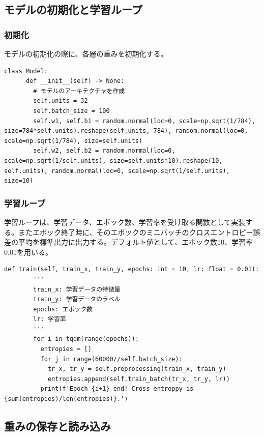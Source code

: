 \documentclass[platex,dvipdfmx]{jsarticle}
\begin{document}
  \newpage

  \subsection{モデルの初期化と学習ループ}

  \subsubsection{初期化}
  モデルの初期化の際に、各層の重みを初期化する。

  \begin{lstlisting}[caption=ex3.py, label=init]
    class Model:
      def __init__(self) -> None:
        # モデルのアーキテクチャを作成
        self.units = 32
        self.batch_size = 100
        self.w1, self.b1 = random.normal(loc=0, scale=np.sqrt(1/784), size=784*self.units).reshape(self.units, 784), random.normal(loc=0, scale=np.sqrt(1/784), size=self.units)
        self.w2, self.b2 = random.normal(loc=0, scale=np.sqrt(1/self.units), size=self.units*10).reshape(10, self.units), random.normal(loc=0, scale=np.sqrt(1/self.units), size=10)
  \end{lstlisting}
  
  \subsubsection{学習ループ}

  学習ループは、学習データ、エポック数、学習率を受け取る関数として実装する。またエポック終了時に、そのエポックのミニバッチのクロスエントロピー誤差の平均を標準出力に出力する。デフォルト値として、エポック数10、学習率0.01を用いる。
  
  \begin{lstlisting}[caption=ex3.py, label=train]
      def train(self, train_x, train_y, epochs: int = 10, lr: float = 0.01):
        '''
        train_x: 学習データの特徴量
        train_y: 学習データのラベル
        epochs: エポック数
        lr: 学習率
        '''
        for i in tqdm(range(epochs)):
          entropies = []
          for j in range(60000//self.batch_size):
            tr_x, tr_y = self.preprocessing(train_x, train_y)
            entropies.append(self.train_batch(tr_x, tr_y, lr))
          print(f'Epoch {i+1} end! Cross entroppy is {sum(entropies)/len(entropies)}.')
  \end{lstlisting}

  \newpage

  \subsection{重みの保存と読み込み}
\end{document}
